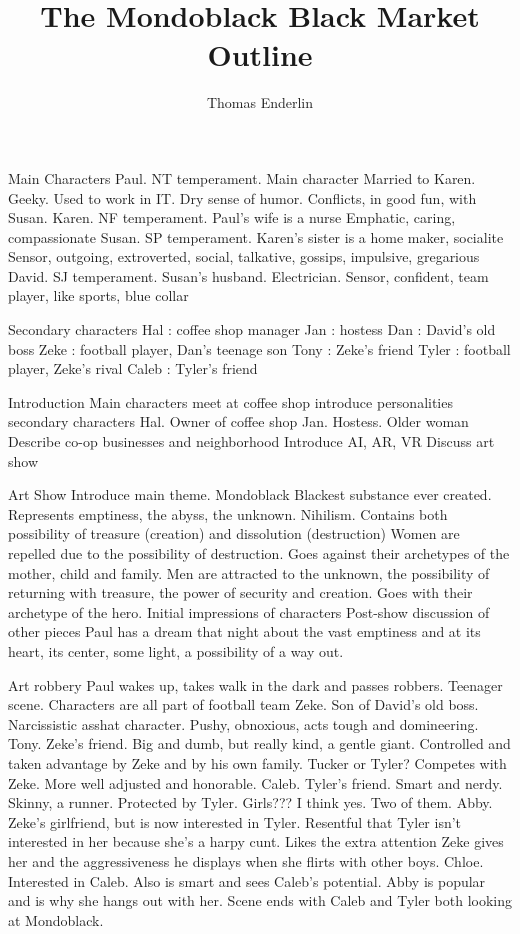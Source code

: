 \documentclass[12pt]{article}
\title{The Mondoblack Black Market Outline}
\author{Thomas Enderlin\vspace{-2ex}}
\date{}
\begin{document}
\maketitle
\begin{outline}[enumerate]
  \1 Main Characters
    \2 Paul.  NT temperament. Main character
      \3 Married to Karen. Geeky. Used to work in IT. Dry sense
      of humor. Conflicts, in good fun, with Susan.
    \2 Karen. NF temperament. Paul's wife is a nurse
      \3 Emphatic, caring, compassionate
    \2 Susan. SP temperament. Karen's sister is a home maker, socialite
      \3 Sensor, outgoing, extroverted, social, talkative,
      gossips, impulsive, gregarious
    \2 David. SJ temperament. Susan's husband. Electrician.
      \3 Sensor, confident, team player, like sports, blue
      collar

  \1 Secondary characters
  \2 Hal : coffee shop manager
  \2 Jan : hostess
  \2 Dan : David's old boss
  \2 Zeke : football player, Dan's teenage son
  \2 Tony : Zeke's friend
  \2 Tyler : football player, Zeke's rival
  \2 Caleb : Tyler's friend


\1 Introduction
  \2 Main characters meet at coffee shop
    \3 introduce personalities
  \2 secondary characters
    \3 Hal. Owner of coffee shop
    \3 Jan. Hostess. Older woman
  \2 Describe co-op businesses and neighborhood
  \2 Introduce AI, AR, VR
  \2 Discuss art show

\1 Art Show
  \2 Introduce main theme. Mondoblack
    \3 Blackest substance ever created. 
    \3 Represents emptiness, the abyss, the unknown. Nihilism.
    \3 Contains both possibility of treasure (creation) and dissolution (destruction)
    \3 Women are repelled due to the possibility of destruction.
    Goes against their archetypes of the mother, child and
    family.
    \3 Men are attracted to the unknown, the possibility of
    returning with treasure, the power of security and creation. Goes
    with their archetype of the hero.
  \2 Initial impressions of characters
  \2 Post-show discussion of other pieces
  \2 Paul has a dream that night about the vast emptiness and at
  its heart, its center, some light, a possibility of a way out.

\1 Art robbery
  \2 Paul wakes up, takes walk in the dark and passes robbers.
  \2 Teenager scene. Characters are all part of football team
    \3 Zeke. Son of David's old boss. Narcissistic asshat
    character. Pushy, obnoxious, acts tough and domineering.
    \3 Tony. Zeke's friend. Big and dumb, but really kind, a
    gentle giant. Controlled and taken advantage by Zeke and by
    his own family.
    \3 Tucker or Tyler? Competes with Zeke. More well adjusted
    and honorable.
    \3 Caleb. Tyler's friend. Smart and nerdy. Skinny, a runner.
    Protected by Tyler.
    \3 Girls??? I think yes. Two of them.
    \3 Abby. Zeke's girlfriend, but is now interested in Tyler.
    Resentful that Tyler isn't interested in her because she's a
    harpy cunt. Likes the extra attention Zeke gives her and the
    aggressiveness he displays when she flirts with other boys.
    \3 Chloe. Interested in Caleb. Also is smart and sees
    Caleb's potential. Abby is popular and is why she hangs out
    with her. 
  \2 Scene ends with Caleb and Tyler both looking at Mondoblack.


\end{outline}
\end{document}
